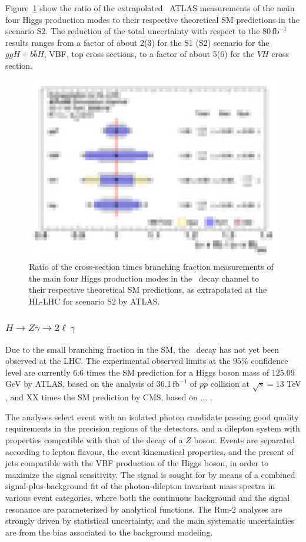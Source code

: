 Figure~\ref{fig:Hyy_ATLAS_HLLHC_S2} show the ratio of the extrapolated \Hyy\ ATLAS measurements of the main four Higgs production modes to their respective theoretical SM predictions in the scenario S2. The reduction of the total uncertainty with respect to the 80\,$\mathrm{fb}^{-1}$ results ranges from a factor of about 2(3) for the S1 (S2) scenario for the $ggH+b\bar{b}H$, VBF, top cross sections, to a factor of about 5(6) for the $VH$ cross section.

\begin{figure}
  \centering
  \includegraphics[width=0.6\linewidth]{section2/plots/channels/ATLAS_Hyy_compareToSM_prodXS}
  \caption{Ratio of the cross-section times branching fraction measurements of the main four Higgs production modes in the \Hyy\ decay channel to their respective theoretical SM predictions, as extrapolated at the HL-LHC for scenario S2 by ATLAS.}
  \label{fig:Hyy_ATLAS_HLLHC_S2}
\end{figure}

\subsubsection{$H \to Z\gamma \to 2\ell\,\gamma$}

Due to the small branching fraction in the SM, the \HZy\ decay has not yet been observed at the LHC. The experimental observed limits at the $95\%$ confidence level are currently 6.6 times the SM prediction for a Higgs boson mass of 125.09 GeV by ATLAS, based on the analysis of 36.1\,$\mathrm{fb}^{-1}$ of $pp$ collision at $\sqrt{s} = 13$ TeV \cite{HIGG-2016-14}, and XX times the SM prediction by CMS, based on ... \cite{}.

The analyses select event with an isolated photon candidate passing good quality requirements in the precision regions of the detectors, and a dilepton system with properties compatible with that of the decay of a $Z$ boson. Events are separated according to lepton flavour, the event kinematical properties, and the present of jets compatible with the VBF production of the Higgs boson, in order to maximize the signal sensitivity. The signal is sought for by means of a combined signal-plus-background fit of the photon-dilepton invariant mass spectra in various event categories, where both the continuous background and the signal resonance are parameterized by analytical functions. The Run-2 analyses are strongly driven by statistical uncertainty, and the main systematic uncertainties are from the bias associated to the background modeling.

